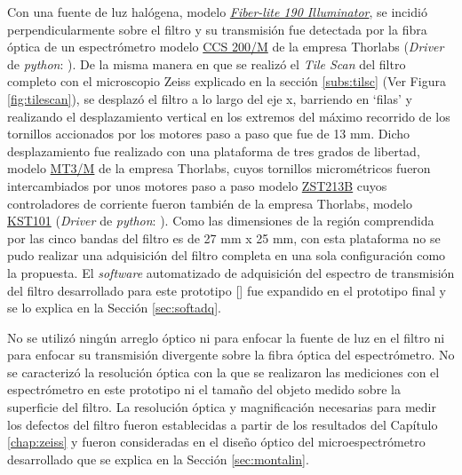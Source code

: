 Con una fuente de luz halógena, modelo \href{https://dolan-jenner.com/products/fiber-lite-190}{\textit{Fiber-lite 190 Illuminator}}, se incidió perpendicularmente sobre el filtro y su transmisión fue detectada por la fibra óptica de un espectrómetro modelo \href{https://www.thorlabs.com/thorproduct.cfm?partnumber=CCS200/M#ad-image-0}{CCS 200/M} de la empresa Thorlabs (\textit{Driver} de \textit{python}: \href{https://github.com/jrr1984/Prototipo0\_S-D\_SpectralGUI/blob/master/syst/CCS200.py}{\faGithub}). De la misma manera en que se realizó el \textit{Tile Scan} del filtro completo con el microscopio Zeiss explicado en la sección \ref{subs:tilsc} (Ver Figura \ref{fig:tilescan}), se desplazó el filtro a lo largo del eje x, barriendo en `filas' y realizando el desplazamiento vertical en los extremos del máximo recorrido de los tornillos accionados por los motores paso a paso que fue de 13 mm. Dicho desplazamiento fue realizado con una plataforma de tres grados de libertad, modelo \href{https://www.thorlabs.com/thorproduct.cfm?partnumber=MT3/M}{MT3/M} de la empresa Thorlabs, cuyos tornillos micrométricos fueron intercambiados por unos motores paso a paso modelo \href{https://www.thorlabs.com/thorproduct.cfm?partnumber=ZST213B}{ZST213B} cuyos controladores de corriente fueron también de la empresa Thorlabs, modelo \href{https://www.thorlabs.com/thorproduct.cfm?partnumber=KST101}{KST101} (\textit{Driver} de \textit{python}: \href{https://github.com/jrr1984/Prototipo0\_S-D\_SpectralGUI/blob/master/barrido/std/thor\_stepm.py}{\faGithub}). Como las dimensiones de la región comprendida por las cinco bandas del filtro es de 27 mm x 25 mm, con esta plataforma no se pudo realizar una adquisición del filtro completa en una sola configuración como la propuesta. El \textit{software} automatizado de adquisición del espectro de transmisión del filtro desarrollado para este prototipo [\href{https://github.com/jrr1984/Prototipo0\_S-D\_SpectralGUI/tree/master/barrido/std}{\faGithub}] fue expandido en el prototipo final y se lo explica en la Sección \ref{sec:softadq}.


No se utilizó ningún arreglo óptico ni para enfocar la fuente de luz en el filtro ni para enfocar su transmisión divergente sobre la fibra óptica del espectrómetro. No se caracterizó la resolución óptica con la que se realizaron las mediciones con el espectrómetro en este prototipo ni el tamaño del objeto medido sobre la superficie del filtro. La resolución óptica y magnificación necesarias para medir los defectos del filtro fueron establecidas a partir de los resultados del Capítulo \ref{chap:zeiss} y fueron consideradas en el diseño óptico del microespectrómetro desarrollado que se explica en la Sección \ref{sec:montalin}.


